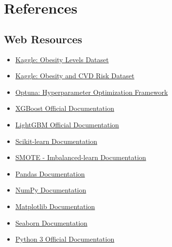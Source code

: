 \documentclass[12pt,a4paper]{report}
\begin{document}
    {
        \chapter*{References}
        \printbibliography

        \vspace{1em}
        \section*{Web Resources}

        \begin{itemize}
            \item \href{https://www.kaggle.com/datasets/irfanasrullah/obesity-levels}{Kaggle: Obesity Levels Dataset}
            \item \href{https://www.kaggle.com/datasets/kalviumcommunity/obesity-cvd-risk}{Kaggle: Obesity and CVD Risk Dataset}
            \item \href{https://optuna.org/}{Optuna: Hyperparameter Optimization Framework}
            \item \href{https://xgboost.readthedocs.io/en/stable/}{XGBoost Official Documentation}
            \item \href{https://lightgbm.readthedocs.io/en/latest/}{LightGBM Official Documentation}
            \item \href{https://scikit-learn.org/stable/}{Scikit-learn Documentation}
            \item \href{https://imbalanced-learn.org/stable/references/generated/imblearn.over_sampling.SMOTE.html}{SMOTE - Imbalanced-learn Documentation}
            \item \href{https://pandas.pydata.org/docs/}{Pandas Documentation}
            \item \href{https://numpy.org/doc/stable/}{NumPy Documentation}
            \item \href{https://matplotlib.org/stable/contents.html}{Matplotlib Documentation}
            \item \href{https://seaborn.pydata.org/}{Seaborn Documentation}
            \item \href{https://docs.python.org/3/}{Python 3 Official Documentation}
        \end{itemize}
    }
\end{document}
